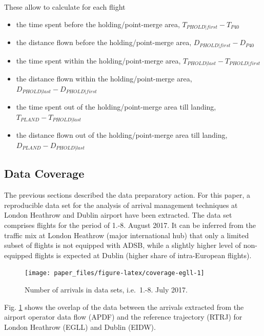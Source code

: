 \documentclass[conference,final,a4paper,]{IEEEtran}
\providecommand{\tightlist}{%
  \setlength{\itemsep}{0pt}\setlength{\parskip}{0pt}}
\begin{document}
These allow to calculate for each flight

\begin{itemize}
\tightlist
\item
  the time spent before the holding/point-merge area,
  \(T_{PHOLD|first} - T_{P40}\)
\item
  the distance flown before the holding/point-merge area,
  \(D_{PHOLD | first} - D_{P40}\)
\item
  the time spent within the holding/point-merge area,
  \(T_{PHOLD | last} - T_{PHOLD|first}\)
\item
  the distance flown within the holding/point-merge area,
  \(D_{PHOLD | last} - D_{PHOLD | first}\)
\item
  the time spent out of the holding/point-merge area till landing,
  \(T_{PLAND} - T_{PHOLD | last}\)
\item
  the distance flown out of the holding/point-merge area till landing,
  \(D_{PLAND} - D_{PHOLD | last}\)
\end{itemize}

\subsection{Data Coverage}\label{data-coverage}

The previous sections described the data preparatory action. For this
paper, a reproducible data set for the analysis of arrival management
techniques at London Heathrow and Dublin airport have been extracted.
The data set comprises flights for the period of 1.-8. August 2017. It
can be inferred from the traffic mix at London Heathrow (major
international hub) that only a limited subset of flights is not equipped
with ADSB, while a slightly higher level of non-equipped flights is
expected at Dublin (higher share of intra-European flights).




\begin{figure}[hbt]

{\centering \texttt{[image: paper\_files/figure-latex/coverage-egll-1]} 

}

\caption{Number of arrivals in data sets, i.e.~1.-8. July
2017.}\label{fig:coverage-egll}
\end{figure}

Fig. \ref{fig:coverage-egll} shows the overlap of the data between the
arrivals extracted from the airport operator data flow (APDF) and the
reference trajectory (RTRJ) for London Heathrow (EGLL) and Dublin
(EIDW).
\end{document}
